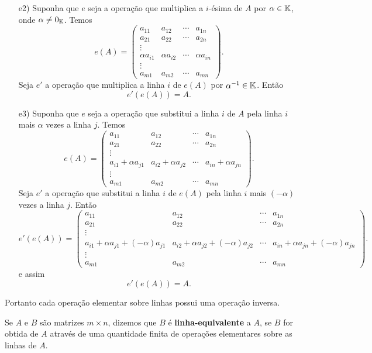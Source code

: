 \begin{prova}
\begin{enumerate}
	\item [e2)] Suponha que $e$ seja a opera\c{c}\~ao que multiplica a $i$-\'esima de $A$ por $\alpha \in \mathbb{K}$, onde $\alpha \ne 0_{\mathbb{K}}$. Temos
	\[
	e(A) = 
	\begin{pmatrix}
	a_{11} & a_{12} & \cdots & a_{1n}\\
	a_{21} & a_{22} & \cdots & a_{2n}\\
	\vdots\\
	\alpha a_{i1} & \alpha a_{i2} & \cdots & \alpha a_{in}\\
	\vdots\\
	a_{m1} & a_{m2} & \cdots & a_{mn}
	\end{pmatrix}.
	\]
	Seja $e'$ a opera\c{c}\~ao que multiplica a linha $i$ de $e(A)$ por $\alpha^{-1} \in \mathbb{K}$. Ent\~ao
	\[
	e'(e(A)) = A.
	\]
	\item [e3)] Suponha que $e$ seja a opera\c{c}\~ao que substitui a linha $i$ de $A$ pela linha $i$ mais $\alpha$ vezes a linha $j$. Temos
	\[
	e(A) = 
	\begin{pmatrix}
	a_{11} & a_{12} & \cdots & a_{1n}\\
	a_{21} & a_{22} & \cdots & a_{2n}\\
	\vdots\\
	a_{i1} + \alpha a_{j1} & a_{i2} + \alpha a_{j2} & \cdots & a_{in} + \alpha a_{jn}\\
	\vdots\\
	a_{m1} & a_{m2} & \cdots & a_{mn}
	\end{pmatrix}.
	\]
	Seja $e'$ a opera\c{c}\~ao que substitui a linha $i$ de $e(A)$ pela linha $i$ mais $(-\alpha)$ vezes a linha $j$. Ent\~ao
	\[
	e'(e(A)) = 
	\begin{pmatrix}
	a_{11} & a_{12} & \cdots & a_{1n}\\
	a_{21} & a_{22} & \cdots & a_{2n}\\
	\vdots\\
	a_{i1} + \alpha a_{j1} + (-\alpha)a_{j1} & a_{i2} + \alpha a_{j2} + (-\alpha)a_{j2} & \cdots & a_{in} + \alpha a_{jn} + (-\alpha)a_{jn}\\
	\vdots\\
	a_{m1} & a_{m2} & \cdots & a_{mn}
	\end{pmatrix}.
	\]
	e assim
	\[
	e'(e(A)) = A.
	\]
\end{enumerate}
Portanto cada opera\c{c}\~ao elementar sobre linhas possui uma opera\c{c}\~ao inversa.
\end{prova}

\begin{definicao}
Se $A$ e $B$ s\~ao matrizes $m \times n$, dizemos que $B$ \'e \textbf{linha-equivalente} a $A$, se $B$ for obtida de $A$ atrav\'es de uma quantidade finita de opera\c{c}\~oes elementares sobre as linhas de $A$.
\end{definicao}

